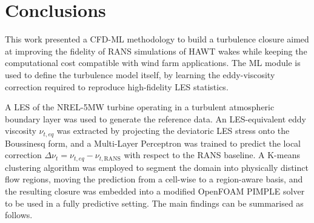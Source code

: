 \section{Conclusions}
\label{sec:conclusions}

This work presented a CFD-ML methodology to build a turbulence closure aimed at improving the fidelity of
RANS simulations of HAWT wakes while keeping the
computational cost compatible with wind farm applications. The ML
module is used to define the turbulence model itself, by
learning the eddy-viscosity correction required to reproduce
high-fidelity LES statistics.

A LES of the NREL-5MW turbine operating in a turbulent atmospheric
boundary layer was used to generate the reference data. An
LES-equivalent eddy viscosity $\nu_{t,eq}$ was extracted by projecting
the deviatoric LES stress onto the Boussinesq form, and a Multi-Layer
Perceptron was trained to predict the local correction
$\Delta\nu_t = \nu_{t,eq} - \nu_{t,\mathrm{RANS}}$ with respect to the
RANS baseline. A K-means clustering algorithm was employed to segment
the domain into physically distinct flow regions, moving the prediction
from a cell-wise to a region-aware basis, and the resulting closure was
embedded into a modified OpenFOAM PIMPLE solver to be used in a fully
predictive setting. The main findings can be summarised as follows.

